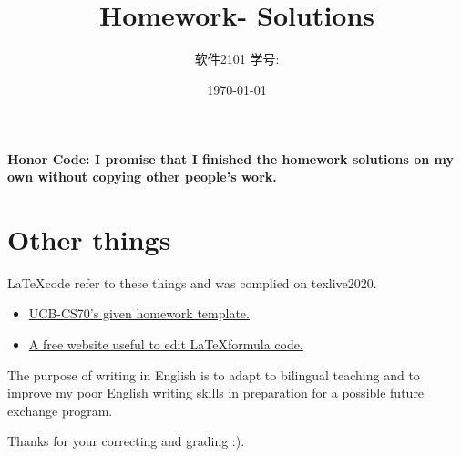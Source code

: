 \documentclass[11pt]{article}  %
\title{\vspace{-4cm}\CourseCodeName \space
        \Session \protect\\  Homework-\textbf{\Homework} Solutions}
\author{软件2101 \Name \space 学号: \SID}
\date{\today}
\begin{document}
\maketitle

\textbf{Honor Code: I promise that I finished the homework solutions on my own without copying other people's 
    work.}


\section*{Other things}

\LaTeX \space code refer to these things and was complied on texlive2020.
\begin{itemize}
    \item  \href{https://www.eecs70.org/assets/misc/homework_template.tex}{UCB-CS70's given homework template.} 
    \item  \href{https://www.latexlive.com}{A free website useful to edit \LaTeX \space formula code.}
\end{itemize}

The purpose of writing in English is to adapt to bilingual teaching and to improve my poor English 
writing skills in preparation for a possible future exchange program. 

Thanks for your correcting and grading :).
\end{document}
